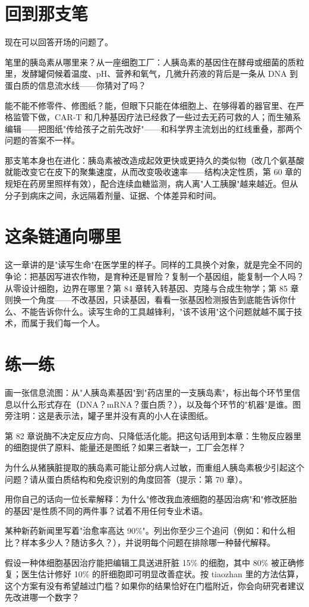 \section{回到那支笔}

现在可以回答开场的问题了。

笔里的胰岛素从哪里来？从一座细胞工厂：人胰岛素的基因住在酵母或细菌的质粒里，发酵罐伺候着温度、pH、营养和氧气，几微升药液的背后是一条从 DNA 到蛋白质的信息流水线——你猜对了吗？

能不能不修零件、修图纸？能，但眼下只能在体细胞上、在够得着的器官里、在严格监管下做，CAR-T 和几种基因疗法已经救了一些过去无药可救的人；而生殖系编辑——把图纸"传给孩子之前先改好"——和科学界主流划出的红线重叠，那两个问题的答案不一样。

那支笔本身也在进化：胰岛素被改造成起效更快或更持久的类似物（改几个氨基酸就能改变它在皮下的聚集速度，从而改变吸收速率——结构决定性质，第 60 章的规矩在药房里照样有效），配合连续血糖监测，病人离"人工胰腺"越来越近。但从分子到病床之间，永远隔着剂量、证据、个体差异和时间。

\section{这条链通向哪里}

这一章讲的是"读写生命"在医学里的样子。同样的工具换个对象，就是完全不同的争论：把基因写进农作物，是育种还是冒险？复制一个基因组，能复制一个人吗？从零设计细胞，边界在哪里？第 84 章转入转基因、克隆与合成生物学；第 85 章则换一个角度——不改基因，只读基因，看看一张基因检测报告到底能告诉你什么、不能告诉你什么。读写生命的工具越锋利，"该不该用"这个问题就越不属于技术，而属于我们每一个人。

\section*{练一练}

\begin{sikaoti}
\item 画一张信息流图：从"人胰岛素基因"到"药店里的一支胰岛素"，标出每个环节里信息以什么形式存在（DNA？mRNA？蛋白质？），以及每个环节的"机器"是谁。图旁注明：这是表示法，罐子里并没有真的小人在读图纸。
\item 第 82 章说酶不决定反应方向、只降低活化能。把这句话用到本章：生物反应器里的细胞提供了原料、能量还是图纸？如果三者缺一，工厂会怎样？
\item 为什么从猪胰脏提取的胰岛素可能让部分病人过敏，而重组人胰岛素极少引起这个问题？请从蛋白质结构和免疫识别的角度回答（提示：第 70 章）。
\item 用你自己的话向一位长辈解释：为什么"修改我血液细胞的基因治病"和"修改胚胎的基因"是性质不同的两件事？试着不用任何专业术语。
\item 某种新药新闻里写着"治愈率高达 90\%"。列出你至少三个追问（例如：和什么相比？样本多少人？随访多久？），并说明每个问题在排除哪一种替代解释。
\item 假设一种体细胞基因治疗能把编辑工具送进肝脏 15\% 的细胞，其中 80\% 被正确修复；医生估计修好 10\% 的肝细胞即可明显改善症状。按 tiaozhan 里的方法估算，这个方案有没有希望越过门槛？如果你的结果恰好在门槛附近，你会向研究者建议先改进哪一个数字？
\end{sikaoti}
